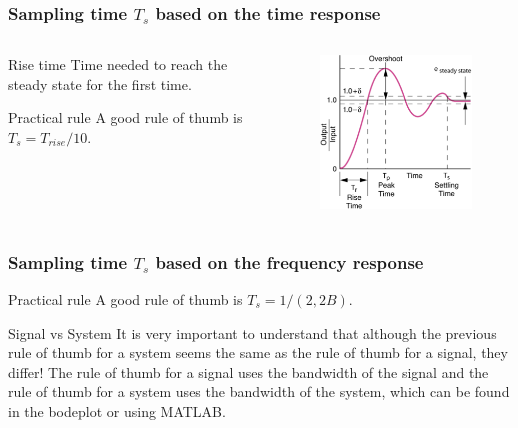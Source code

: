 \begin{frame}
	\frametitle{Sampling time $T_s$ based on the time response}
\begin{columns}
	\begin{column}{0.5\textwidth}
	\begin{block}{Rise time}
		Time needed to reach the steady state for the first time.
	\end{block}
	\begin{block}{Practical rule}
		A good rule of thumb is $T_s = T_{rise}/10$.
	\end{block}
	\end{column}
	
	\begin{column}{0.5\textwidth}
		\begin{figure}
			\centering
			\includegraphics[width=1\linewidth]{rise_time}
		\end{figure}
	\end{column}
\end{columns}
\end{frame}

\begin{frame}
	\frametitle{Sampling time $T_s$ based on the frequency response}
	\begin{block}{Practical rule}
		A good rule of thumb is $T_s = 1/(2,2B)$.
	\end{block}
	\begin{alertblock}{Signal vs System}
		It is very important to understand that although the previous rule of thumb for a system seems the same as the rule of thumb for a signal, they differ! The rule of thumb for a signal uses the bandwidth of the signal and the rule of thumb for a system uses the bandwidth of the system, which can be found in the bodeplot or using MATLAB.
	\end{alertblock}
\end{frame}


